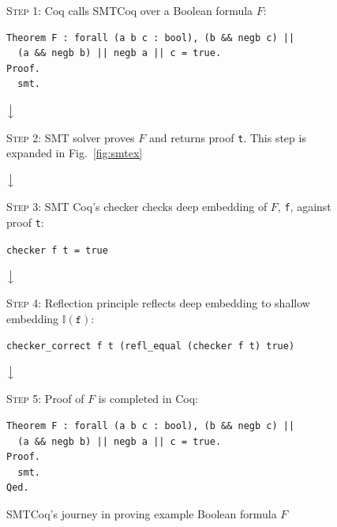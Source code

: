 \documentclass{article}
\begin{document}
	\begin{figure}
		\begin{framed}
			\textsc{Step 1}: Coq calls SMTCoq over 
			a Boolean formula $F$:
			\begin{verbatim}
Theorem F : forall (a b c : bool), (b && negb c) || 
  (a && negb b) || negb a || c = true.
Proof.
  smt.
			\end{verbatim}
		\end{framed}
		
		\begin{center}
			$\big\downarrow$
		\end{center}
		
		\begin{framed}
			\begin{center}
				\textsc{Step 2}: SMT solver 
				proves $F$ and returns proof 
				\texttt{t}. This step is 
				expanded in Fig.~\ref{fig:smtex}
			\end{center}
		\end{framed}
		
		\begin{center}
			$\big\downarrow$
		\end{center}
		
		\begin{framed}
			\textsc{Step 3}: SMT Coq's checker 
			checks deep embedding of $F$, 
			\texttt{f}, against proof 
			\texttt{t}:
			\begin{center}
				\texttt{checker f t = true}
			\end{center}
		\end{framed}
		
		\begin{center}
			$\big\downarrow$
		\end{center}
		
		\begin{framed}
			\textsc{Step 4}: Reflection principle 
			reflects deep embedding to shallow 
			embedding $\mathbb{I}(\texttt{f})$:
			\begin{center}
				\texttt{checker\_correct f t 
					(refl\_equal (checker 
					f t) true)}
			\end{center}
		\end{framed}
		
		\begin{center}
			$\big\downarrow$
		\end{center}
		
		\begin{framed}
			\textsc{Step 5}: Proof of $F$ is 
			completed in Coq:
			\begin{verbatim}
Theorem F : forall (a b c : bool), (b && negb c) || 
  (a && negb b) || negb a || c = true.
Proof.
  smt.
Qed.
			\end{verbatim}
		\end{framed}
		
		\caption{SMTCoq's journey in proving 
			example Boolean formula $F$}
		\label{fig:smtcoqex}
	\end{figure}
\end{document}
